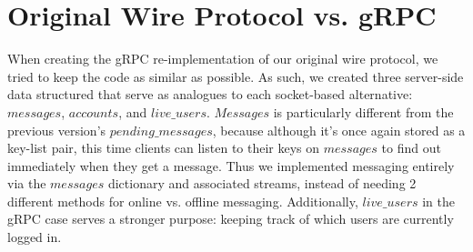 \documentclass[
	a4paper, %
	10pt, %
	unnumberedsections, %
	twoside, %
]{LTJournalArticle}
\begin{document}
\section{Original Wire Protocol vs. gRPC}
When creating the gRPC re-implementation of our original wire protocol, we tried to keep the code as similar as possible. As such, we created three server-side data structured that serve as analogues to each socket-based alternative: $messages$, $accounts$, and $live\_users$. $Messages$ is particularly different from the previous version's $pending\_messages$, because although it's once again stored as a key-list pair, this time clients can listen to their keys on $messages$ to find out immediately when they get a message. Thus we implemented messaging entirely via the $messages$ dictionary and associated streams, instead of needing 2 different methods for online vs. offline messaging. Additionally, $live\_users$ in the gRPC case serves a stronger purpose: keeping track of which users are currently logged in.
\end{document}

